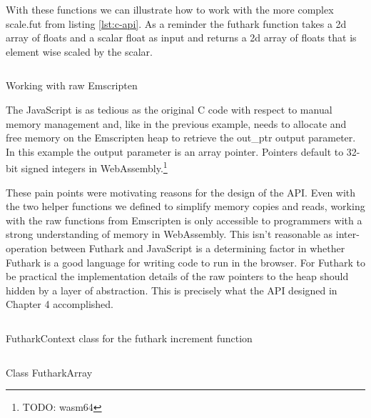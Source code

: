 \documentclass[11pt]{book}
\begin{document}
With these functions we can illustrate how to work with the more complex scale.fut from listing \ref{lst:c-api}. As a reminder the futhark function takes a 2d array of floats and a scalar float as input and returns a 2d array of floats that is element wise scaled by the scalar. 

\begin{listing}[H] 
        \inputminted[fontsize=\small,baselinestretch=0.5,linenos]{JavaScript}{code/compiler/api_examples/raw.js}
        \caption{Working with raw Emscripten }
        \label{lst:raw}    
\end{listing} 

The JavaScript is as tedious as the original C code with respect to manual memory management and, like in the previous example, needs to allocate and free memory on the Emscripten heap to retrieve the out\_ptr output parameter. In this example the output parameter is an array pointer. Pointers default to 32-bit signed integers in WebAssembly.\footnote{TODO: wasm64}

These pain points were motivating reasons for the design of the API. Even with the two helper functions we defined to simplify memory copies and reads, working with the raw functions from Emscripten is only accessible to programmers with a strong understanding of memory in WebAssembly. This isn't reasonable as inter-operation between Futhark and JavaScript is a determining factor in whether Futhark is a good language for writing code to run in the browser. For Futhark to be practical the implementation details of the raw pointers to the heap should hidden by a layer of abstraction. This is precisely what the API designed in Chapter 4 accomplished. 



\begin{listing}[H] 
        \inputminted[fontsize=\small,baselinestretch=0.5,linenos]{JavaScript}{code/compiler/api_examples/FutharkContext_incr.js}
        \caption{FutharkContext class for the futhark increment function}
        \label{lst:FutharkContext_incr}    
\end{listing} 







\begin{listing}[H] 
        \inputminted[fontsize=\small,baselinestretch=0.5,linenos]{JavaScript}{code/compiler/api_examples/FutharkArray.js}
        \caption{Class FutharkArray}
        \label{lst:FutharkArray}    
\end{listing} 
\end{document}
